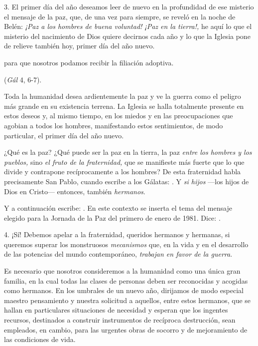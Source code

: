 \begin{body}
	3. El primer día del año deseamos leer de nuevo en la profundidad de ese misterio el mensaje de la paz, que, de una vez para siempre, se reveló en la noche de Belén: \emph{¡Paz a los hombres de buena voluntad! ¡Paz en la tierra!,} he aquí lo que el misterio del nacimiento de Dios quiere decirnos cada año y lo que la Iglesia pone de relieve también hoy, primer día del año nuevo.
	
	 para que nosotros podamos recibir la filiación adoptiva.
	
	 (\emph{Gál} 4, 6-7).
	
	Toda la humanidad desea ardientemente la paz y ve la guerra como el peligro más grande en su existencia terrena. La Iglesia se halla totalmente presente en estos deseos y, al mismo tiempo, en los miedos y en las preocupaciones que agobian a todos los hombres, manifestando estos sentimientos, de modo particular, el primer día del año nuevo.
	
	¿Qué es la paz? ¿Qué puede ser la paz en la tierra, la paz \emph{entre los hombres y los pueblos,} sino \emph{el fruto de la fraternidad,} que se manifieste más fuerte que lo que divide y contrapone recíprocamente a los hombres? De esta fraternidad habla precisamente San Pablo, cuando escribe a los Gálatas: . Y \emph{si hijos} ---los hijos de Dios en Cristo--- entonces, también \emph{hermanos}.
	
	Y a continuación escribe: . En este contexto se inserta el tema del mensaje elegido para la Jornada de la Paz del primero de enero de 1981. Dice: \emph{}.
	
	4. ¡Sí! Debemos apelar a la fraternidad, queridos hermanos y hermanas, si queremos superar los monstruosos \emph{mecanismos} que, en la vida y en el desarrollo de las potencias del mundo contemporáneo, \emph{trabajan en favor de la guerra}.
	
	Es necesario que nosotros consideremos a la humanidad como una única gran familia, en la cual todas las clases de personas deben ser reconocidas y acogidas como hermanos. En los umbrales de un nuevo año, dirijamos de modo especial maestro pensamiento y nuestra solicitud a aquellos, entre estos hermanos, que se hallan en particulares situaciones de necesidad y esperan que los ingentes recursos, destinados a construir instrumentos de recíproca destrucción, sean empleados, en cambio, para las urgentes obras de socorro y de mejoramiento de las condiciones de vida.
	

\end{body}
